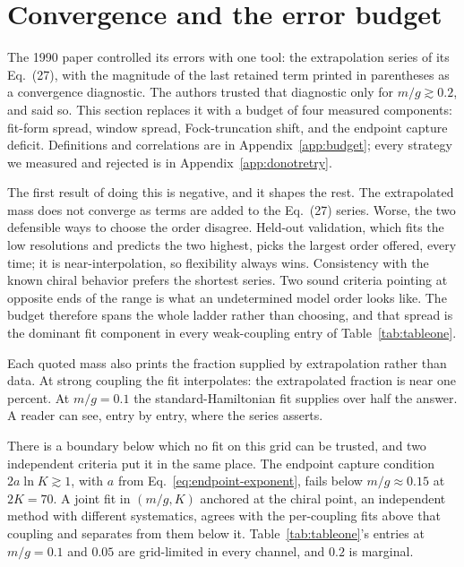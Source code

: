 \section{Convergence and the error budget}
\label{sec:budget}

The 1990 paper controlled its errors with one tool: the extrapolation
series of its Eq.~(27), with the magnitude of the last retained term
printed in parentheses as a convergence diagnostic.  The authors trusted
that diagnostic only for $m/g \gtrsim 0.2$, and said so.  This section
replaces it with a budget of four measured components: fit-form spread,
window spread, Fock-truncation shift, and the endpoint capture deficit.
Definitions and correlations are in Appendix~\ref{app:budget}; every
strategy we measured and rejected is in Appendix~\ref{app:donotretry}.

The first result of doing this is negative, and it shapes the rest.  The
extrapolated mass does not converge as terms are added to the Eq.~(27)
series.  Worse, the two defensible ways to choose the order disagree.
Held-out validation, which fits the low resolutions and predicts the two
highest, picks the largest order offered, every time; it is
near-interpolation, so flexibility always wins.  Consistency with the
known chiral behavior prefers the shortest series.  Two sound criteria
pointing at opposite ends of the range is what an undetermined model order
looks like.  The budget therefore spans the whole ladder rather than
choosing, and that spread is the dominant fit component in every
weak-coupling entry of Table~\ref{tab:tableone}.

Each quoted mass also prints the fraction supplied by extrapolation rather
than data.  At strong coupling the fit interpolates: the extrapolated
fraction is near one percent.  At $m/g = 0.1$ the standard-Hamiltonian
fit supplies over half the answer.  A reader can see, entry by entry,
where the series asserts.

There is a boundary below which no fit on this grid can be trusted, and
two independent criteria put it in the same place.  The endpoint capture
condition $2a \ln K \gtrsim 1$, with $a$ from
Eq.~\eqref{eq:endpoint-exponent}, fails below $m/g \approx 0.15$ at
$2K = 70$.  A joint fit in $(m/g, K)$ anchored at the chiral point, an
independent method with different systematics, agrees with the
per-coupling fits above that coupling and separates from them below it.
Table~\ref{tab:tableone}'s entries at $m/g = 0.1$ and $0.05$ are
grid-limited in every channel, and $0.2$ is marginal.

